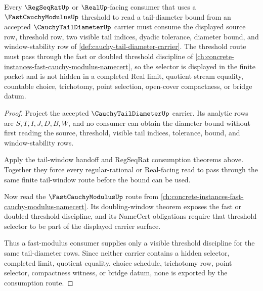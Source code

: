 \begin{theorem}
\label{thm:cauchy-tail-diameter-fast-modulus-consumption}
Every $\RegSeqRatUp$ or $\RealUp$-facing consumer that uses a $\FastCauchyModulusUp$ threshold to read a tail-diameter bound from an accepted $\CauchyTailDiameterUp$ carrier must consume the displayed source row, threshold row, two visible tail indices, dyadic tolerance, diameter bound, and window-stability row of \autoref{def:cauchy-tail-diameter-carrier}. The threshold route must pass through the fast or doubled threshold discipline of \autoref{ch:concrete-instances-fast-cauchy-modulus-namecert}, so the selector is displayed in the finite packet and is not hidden in a completed Real limit, quotient stream equality, countable choice, trichotomy, point selection, open-cover compactness, or bridge datum.
\end{theorem}
\begin{proof}
Project the accepted $\CauchyTailDiameterUp$ carrier. Its analytic rows are $S,T,I,J,D,B,W$, and no consumer can obtain the diameter bound without first reading the source, threshold, visible tail indices, tolerance, bound, and window-stability rows.

Apply the tail-window handoff and RegSeqRat consumption theorems above. Together they force every regular-rational or Real-facing read to pass through the same finite tail-window route before the bound can be used.

Now read the $\FastCauchyModulusUp$ route from \autoref{ch:concrete-instances-fast-cauchy-modulus-namecert}. Its doubling-window theorem exposes the fast or doubled threshold discipline, and its NameCert obligations require that threshold selector to be part of the displayed carrier surface.

Thus a fast-modulus consumer supplies only a visible threshold discipline for the same tail-diameter rows. Since neither carrier contains a hidden selector, completed limit, quotient equality, choice schedule, trichotomy row, point selector, compactness witness, or bridge datum, none is exported by the consumption route.
\end{proof}


